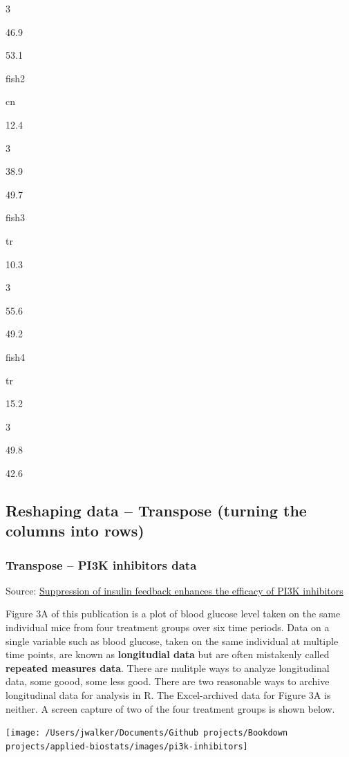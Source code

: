 \documentclass[]{book}
\begin{document}
3

46.9

53.1

fish2

cn

12.4

3

38.9

49.7

fish3

tr

10.3

3

55.6

49.2

fish4

tr

15.2

3

49.8

42.6

\hypertarget{reshaping-data-transpose-turning-the-columns-into-rows}{%
\subsection{Reshaping data -- Transpose (turning the columns into rows)}\label{reshaping-data-transpose-turning-the-columns-into-rows}}

\hypertarget{transpose-pi3k-inhibitors-data}{%
\subsubsection{Transpose -- PI3K inhibitors data}\label{transpose-pi3k-inhibitors-data}}

Source: \href{https://www.nature.com/articles/s41586-018-0343-4}{Suppression of insulin feedback enhances the efficacy of PI3K inhibitors}

Figure 3A of this publication is a plot of blood glucose level taken on the same individual mice from four treatment groups over six time periods. Data on a single variable such as blood glucose, taken on the same individual at multiple time points, are known as \textbf{longitudial data} but are often mistakenly called \textbf{repeated measures data}. There are mulitple ways to analyze longitudinal data, some goood, some less good. There are two reasonable ways to archive longitudinal data for analysis in R. The Excel-archived data for Figure 3A is neither. A screen capture of two of the four treatment groups is shown below.

\texttt{[image: /Users/jwalker/Documents/Github projects/Bookdown projects/applied-biostats/images/pi3k-inhibitors]}
\end{document}
